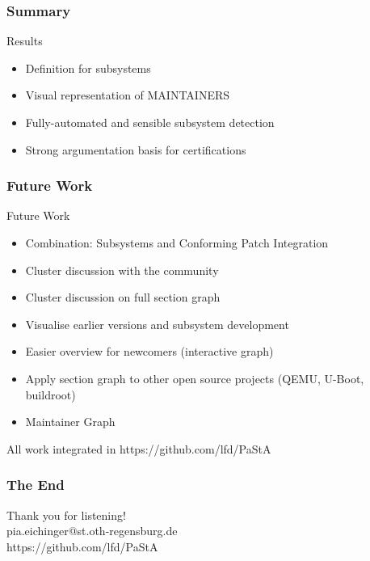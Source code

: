 \documentclass[9pt]{beamer}
\begin{document}
	\begin{frame}
	\frametitle{Summary}
		\begin{block}{Results}
			\begin{itemize}
				\item Definition for subsystems
				\item Visual representation of MAINTAINERS
				\item Fully-automated and sensible subsystem detection
				\item Strong argumentation basis for certifications
			\end{itemize}
		\end{block}
	\end{frame}

	\begin{frame}
	\frametitle{Future Work}
		\begin{block}{Future Work}
			\begin{itemize}
				\item Combination: Subsystems and Conforming Patch Integration
				\item Cluster discussion with the community
				\item Cluster discussion on full section graph
				\item Visualise earlier versions and subsystem development
				\item Easier overview for newcomers (interactive graph)
				\item Apply section graph to other open source projects (QEMU, U-Boot, buildroot)
				\item Maintainer Graph
			\end{itemize}
		\end{block}

		All work integrated in https://github.com/lfd/PaStA
	\end{frame}


	\begin{frame}
	\frametitle{The End}
	\begin{center}
	\huge Thank you for listening!\\
	\small pia.eichinger@st.oth-regensburg.de\\
	https://github.com/lfd/PaStA
	\end{center}
	\end{frame}
\end{document}
